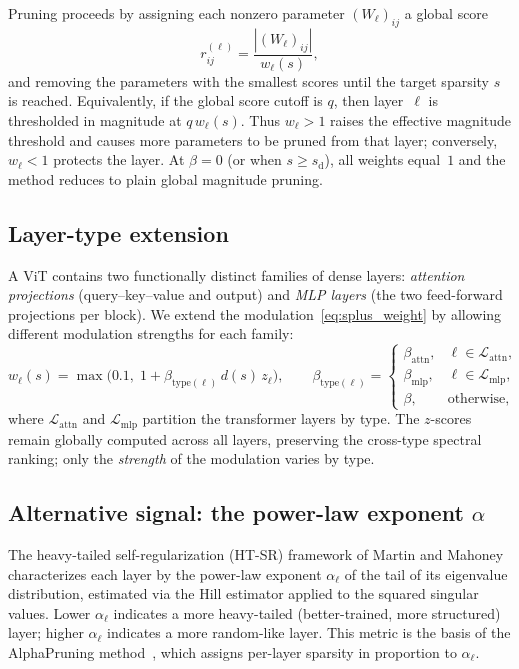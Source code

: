 \documentclass[11pt]{article}
\theoremstyle{plain}
\theoremstyle{definition}
\theoremstyle{remark}
\newcommand{\1}{\mathbf{1}}
\begin{document}
Pruning proceeds by assigning each nonzero parameter \((W_\ell)_{ij}\) a global score
\[
r_{ij}^{(\ell)} = \frac{|(W_\ell)_{ij}|}{w_\ell(s)},
\]
and removing the parameters with the smallest scores until the target sparsity \(s\) is reached.  Equivalently, if the global score cutoff is \(q\), then layer~\(\ell\) is thresholded in magnitude at \(q\,w_\ell(s)\). Thus \(w_\ell>1\) raises the effective magnitude threshold and causes more parameters to be pruned from that layer; conversely, \(w_\ell<1\) protects the layer.  At \(\beta=0\) (or when \(s\ge s_{\mathrm{d}}\)), all weights equal~\(1\) and the method reduces to plain global magnitude pruning.

\subsection{Layer-type extension}
\label{subsec:layer_type}

A ViT contains two functionally distinct families of dense layers: \emph{attention projections} (query--key--value and output) and \emph{MLP layers} (the two feed-forward projections per block).  We extend the modulation~\eqref{eq:splus_weight} by allowing different modulation strengths for each family:
\begin{equation}
\label{eq:layertype_weight}
w_\ell(s)
= \max\!\Big(0.1,\;1 + \beta_{\mathrm{type}(\ell)}\,d(s)\,z_\ell\Big),
\qquad
\beta_{\mathrm{type}(\ell)}
=
\begin{cases}
\beta_{\mathrm{attn}}, & \ell \in \mathcal{L}_{\mathrm{attn}},\\[2pt]
\beta_{\mathrm{mlp}}, & \ell \in \mathcal{L}_{\mathrm{mlp}},\\[2pt]
\beta, & \text{otherwise},
\end{cases}
\end{equation}
where \(\mathcal{L}_{\mathrm{attn}}\) and \(\mathcal{L}_{\mathrm{mlp}}\) partition the transformer layers by type. The \(z\)-scores remain globally computed across all layers, preserving the cross-type spectral ranking; only the \emph{strength} of the modulation varies by type.

\subsection{Alternative signal: the power-law exponent \texorpdfstring{\(\alpha\)}{alpha}}
\label{subsec:alpha_signal}

The heavy-tailed self-regularization (HT-SR) framework of Martin and Mahoney~\cite{martin2021implicit,martin2020heavy} characterizes each layer by the power-law exponent \(\alpha_\ell\) of the tail of its eigenvalue distribution, estimated via the Hill estimator applied to the squared singular values.  Lower \(\alpha_\ell\) indicates a more heavy-tailed (better-trained, more structured) layer; higher \(\alpha_\ell\) indicates a more random-like layer.  This metric is the basis of the AlphaPruning method~\cite{lu2024alphapruning}, which assigns per-layer sparsity in proportion to \(\alpha_\ell\).
\end{document}
